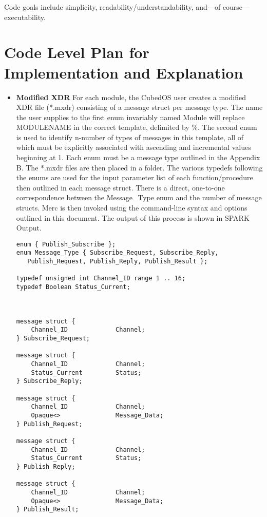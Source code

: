 Code goals include simplicity, readability/understandability, and—of course—executability.

\section{Code Level Plan for Implementation and Explanation}

\begin{itemize}
\item \textbf{Modified XDR} For each module, the CubedOS user creates a modified XDR file
  (*.mxdr) consisting of a message struct per message type. The name the user supplies to the
  first enum invariably named Module will replace MODULENAME in the correct template, delimited
  by \%. The second enum is used to identify n-number of types of messages in this template, all
  of which must be explicitly associated with ascending and incremental values beginning at 1.
  Each enum must be a message type outlined in the Appendix B. The *.mxdr files are then placed
  in a folder. The various typedefs following the enums are used for the input parameter list of
  each function/procedure then outlined in each message struct. There is a direct, one-to-one
  correspondence between the Message\_Type enum and the number of message structs. Merc is
  then invoked using the command-line syntax and options outlined in this document. The output
  of this process is shown in SPARK Output.
\begin{verbatim}
enum { Publish_Subscribe };
enum Message_Type { Subscribe_Request, Subscribe_Reply, 
   Publish_Request, Publish_Reply, Publish_Result };

typedef unsigned int Channel_ID range 1 .. 16;
typedef Boolean Status_Current;



message struct {
    Channel_ID             Channel;
} Subscribe_Request;

message struct {
    Channel_ID             Channel;
    Status_Current         Status;
} Subscribe_Reply;

message struct {
    Channel_ID             Channel;
    Opaque<>               Message_Data;
} Publish_Request;

message struct {
    Channel_ID             Channel;
    Status_Current         Status;
} Publish_Reply;

message struct {
    Channel_ID             Channel;
    Opaque<>               Message_Data;
} Publish_Result;
\end{verbatim}
  

\end{itemize}
